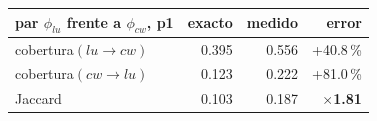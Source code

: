 \begin{tabular}{lrrr}
\toprule
par $\phi_{lu}$ frente a $\phi_{cw}$, p1 & exacto & medido & error \\
\midrule
cobertura$(lu \to cw)$ & 0.395 & 0.556 & +40.8\,\% \\
cobertura$(cw \to lu)$ & 0.123 & 0.222 & +81.0\,\% \\
Jaccard & 0.103 & 0.187 & \textbf{$\times$1.81} \\
\bottomrule
\end{tabular}
